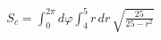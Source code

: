 \documentclass[preview]{standalone}
\begin{document}
\begin{align*}
S_c = \int_0^{2\pi} d\varphi \int_4^5 r\,dr\, \sqrt{\frac{25}{25 - r^2}}
\end{align*}
\end{document}
